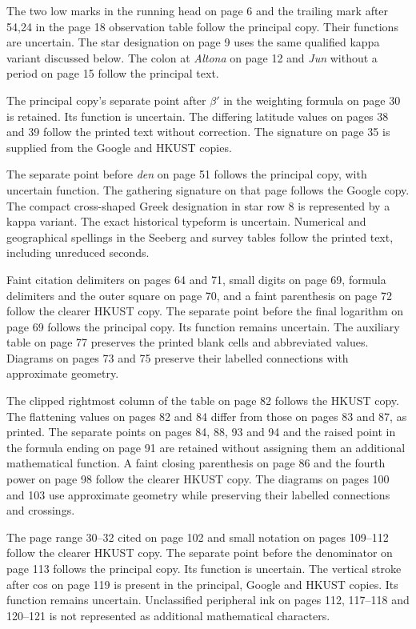 The two low marks in the running head on page 6 and the trailing mark
after 54,24 in the page 18 observation table follow the principal copy. Their functions are uncertain. The star designation on page 9 uses the
same qualified kappa variant discussed below. The colon at \textit{Altona} on page 12 and \textit{Jun} without a period on page 15 follow the principal text.

The principal copy's separate point after \(\beta'\) in the weighting
formula on page 30 is retained. Its function is uncertain. The differing
latitude values on pages 38 and 39 follow the printed text without correction.
The signature on page 35 is supplied from the Google and HKUST copies.

The separate point before \textit{den} on page 51 follows the principal copy, with uncertain function. The gathering signature on that page follows the Google copy. The compact cross-shaped Greek designation in star row 8 is represented by a kappa variant. The exact historical typeform is uncertain. Numerical and geographical spellings in the Seeberg and survey tables follow the printed text, including unreduced seconds.

Faint citation delimiters on pages 64 and 71, small digits on page 69,
formula delimiters and the outer square on page 70, and a faint
parenthesis on page 72 follow the clearer HKUST copy. The separate point
before the final logarithm on page 69 follows the principal copy. Its function remains uncertain. The auxiliary table on page 77 preserves
the printed blank cells and abbreviated values. Diagrams on pages 73
and 75 preserve their labelled connections with approximate geometry.

The clipped rightmost column of the table on page 82 follows the HKUST
copy. The flattening values on pages 82 and 84 differ from those on
pages 83 and 87, as printed. The separate points on pages 84, 88, 93 and
94 and the raised point in the formula ending on page 91 are retained
without assigning them an additional mathematical function. A faint
closing parenthesis on page 86 and the fourth power on page 98 follow
the clearer HKUST copy. The diagrams on pages 100 and 103 use approximate
geometry while preserving their labelled connections and crossings.

The page range 30--32 cited on page 102 and small notation on pages
109--112 follow the clearer HKUST copy. The separate point before the
denominator on page 113 follows the principal copy. Its function is uncertain. The vertical stroke after cos on page 119 is present in the
principal, Google and HKUST copies. Its function remains uncertain.
Unclassified peripheral ink on pages 112, 117--118 and 120--121 is not
represented as additional mathematical characters.

